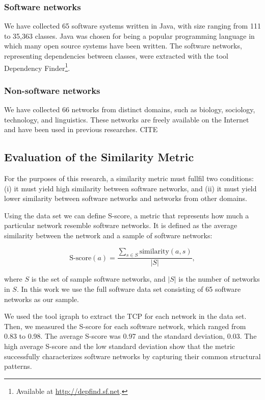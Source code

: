 \subsubsection{Software networks} We have collected 65 software systems written in
Java, with size ranging from 111 to 35,363 classes. Java was chosen for being a
popular programming language in which many open source systems have been
written. The software networks, representing dependencies between classes, were
extracted with the tool Dependency Finder\footnote{Available at
\url{http://depfind.sf.net}.}.

\subsubsection{Non-software networks} We have collected 66 networks from distinct
domains, such as biology, sociology, technology, and linguistics. These networks
are freely available on the Internet and have been used in previous researches.
CITE


\subsection{Evaluation of the Similarity Metric}


For the purposes of this research, a similarity metric must fullfil two
conditions: (i) it must yield high similarity between software networks, and
(ii) it must yield lower similarity between software networks and networks from
other domains.

Using the data set we can define S-score, a metric that represents how much a
particular network resemble software networks. It is defined as the average
similarity between the network and a sample of software networks:

$$
\mathrm{S\mbox{-}score}(a) = \frac{
\displaystyle\sum_{s \in S} \mathrm{similarity}(a, s)
}{|S|} \mathrm{,}
$$

where $S$ is the set of sample software networks, and $|S|$ is the number of
networks in $S$. In this work we use the full software data set consisting of 65
software networks as our sample.

We used the tool igraph \cite{igraph} to extract the TCP for each network in the
data set. Then, we measured the S-score for each software network, which ranged
from 0.83 to 0.98. The average S-score was 0.97 and the standard deviation,
0.03. The high average S-score and the low standard deviation show that the
metric successfully characterizes software networks by capturing their common
structural patterns.

